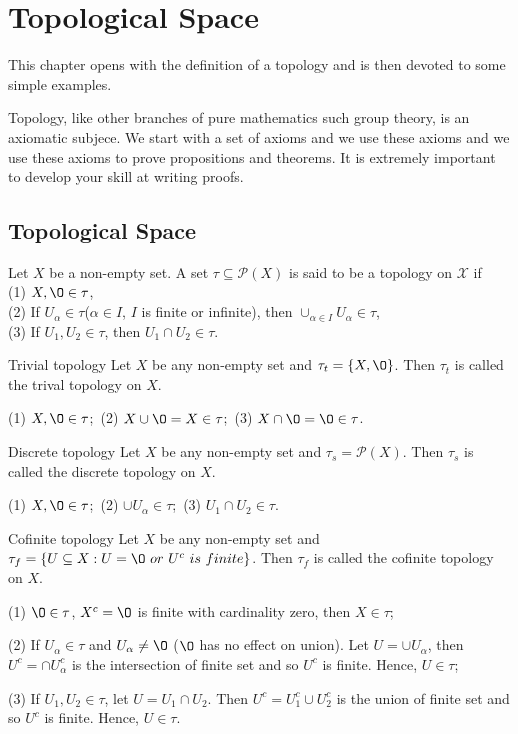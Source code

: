 \chapter{Topological Space}\label{1_1}

This chapter opens with the definition of a topology and 
is then devoted to some simple examples.
\par
Topology, like other branches of pure mathematics such group theory,
is an axiomatic subjece. We start with a set of axioms and we use these 
axioms and we use these axioms to prove propositions and theorems. 
It is extremely important to develop your skill at writing proofs.
\section{Topological Space}
\begin{definition}{}{}
    Let $X$ be a non-empty set. A set $\tau\subseteq \mathcal{P}(X)$ is said to be 
    a topology on $\mathcal{X}$ if\\
    (1) $X,\O\in\tau$, \\
    (2) If $U_{\alpha}\in\tau$($\alpha\in I$, $I$ is finite or infinite), then $\cup_{\alpha\in I}U_{\alpha}\in \tau$,\\
    (3) If $U_1,U_2\in \tau$, then $U_1\cap U_2\in \tau$. 
\end{definition}

\begin{example}{Trivial topology}{}
        Let $X$ be any non-empty set and $\tau_t = \{X,\O\}$.
        Then $\tau_t$ is called the trival topology on $X$. 
\end{example}
(1) $X,\O\in\tau$;\   (2) $X\cup \O=X\in\tau$;\  (3) $X\cap\O=\O\in\tau$.

\begin{example}{Discrete topology}{}
    Let $X$ be any non-empty set and $\tau_s = \mathcal{P}(X)$.
        Then $\tau_s$ is called the discrete topology on $X$.
\end{example}
(1) $X,\O\in\tau$;\   (2) $\cup U_{\alpha}\in\tau$;\  (3) $U_1\cap U_2\in\tau$.

\begin{example}{Cofinite topology}{}
    Let $X$ be any non-empty set and $\tau_f = \{U\subseteq X: U=\O \ or \ U^{c}\ is \ finite\}$.
        Then $\tau_f$ is called the cofinite topology on $X$.
\end{example}
(1) $\O\in\tau$, $X^c=\O$ is finite with cardinality zero, then $X\in\tau$;
\par
(2) If $U_{\alpha}\in\tau$ and $U_{\alpha}\neq\O$ ($\O$ has no effect on union).
Let $U=\cup U_{\alpha}$, then $U^c=\cap U_{\alpha}^c$ is the intersection of finite set and so $U^c$ is finite.
Hence, $U\in\tau$;
\par
(3) If $U_1,U_2\in\tau$, let $U=U_1\cap U_2$. Then $U^c=U_1^c\cup U_2^c$ is the union of finite set and so $U^c$ is finite.
Hence, $U\in\tau$. 

